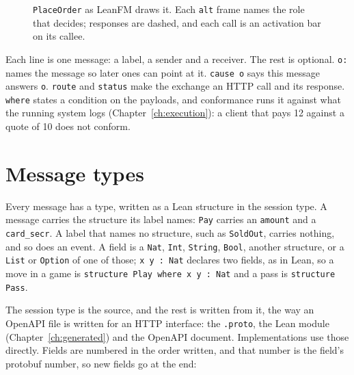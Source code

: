 \begin{figure}[htbp]
\centering
{}
\caption{\texttt{PlaceOrder} as LeanFM draws it. Each \texttt{alt} frame names the
role that decides; responses are dashed, and each call is an activation bar on
its callee.}
\label{fig:placeorder}
\end{figure}

Each line is one message: a label, a sender and a receiver. The rest is optional.
\texttt{o:} names the message so later ones can point at it. \texttt{cause o} says
this message answers \texttt{o}. \texttt{route} and \texttt{status} make the
exchange an HTTP call and its response. \texttt{where} states a condition on the
payloads, and conformance runs it against what the running system logs
(Chapter~\ref{ch:execution}): a client that pays 12 against a quote of 10 does not
conform.

\section{Message types}

Every message has a type, written as a Lean structure in the session type. A
message carries the structure its label names: \texttt{Pay} carries an
\texttt{amount} and a \texttt{card\_secr}. A label that names no structure, such as
\texttt{SoldOut}, carries nothing, and so does an event. A field is a
\texttt{Nat}, \texttt{Int}, \texttt{String}, \texttt{Bool}, another structure, or a
\texttt{List} or \texttt{Option} of one of those; \texttt{x y : Nat} declares two
fields, as in Lean, so a move in a game is \texttt{structure Play where x y : Nat}
and a pass is \texttt{structure Pass}.

The session type is the source, and the rest is written from it, the way an
OpenAPI file is written for an HTTP interface: the \texttt{.proto}, the Lean module
(Chapter~\ref{ch:generated}) and the OpenAPI document. Implementations use those
directly. Fields are numbered in the order written, and that number is the
field's protobuf number, so new fields go at the end:

